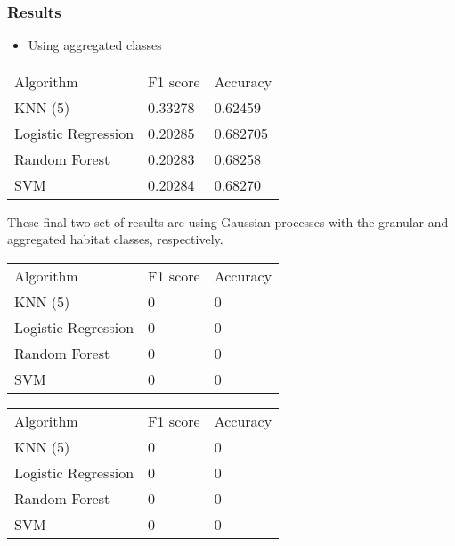 \documentclass{beamer}
\begin{document}
\begin{frame}
    \frametitle{Results}
    
    \begin{itemize}
        \item Using aggregated classes
    \end{itemize}

    \begin{tabular}{l | l | l}
        Algorithm & F1 score & Accuracy \\
        KNN (5) & 0.33278 & 0.62459 \\
        Logistic Regression & 0.20285 & 0.682705 \\
        Random Forest & 0.20283 & 0.68258 \\
        SVM & 0.20284 & 0.68270 \\
    \end{tabular}

\end{frame}


\begin{frame}
    These final two set of results are using Gaussian processes with the granular and aggregated habitat classes, respectively.

    \begin{tabular}{l | l | l}
        Algorithm & F1 score & Accuracy \\
        KNN (5) & 0 & 0\\
        Logistic Regression & 0& 0\\
        Random Forest & 0& 0\\
        SVM & 0 & 0\\
    \end{tabular}

    \begin{tabular}{l | l | l}
        Algorithm & F1 score & Accuracy \\
        KNN (5) & 0 & 0\\
        Logistic Regression & 0& 0\\
        Random Forest & 0& 0\\
        SVM & 0 & 0\\
    \end{tabular}
\end{frame}
\end{document}
